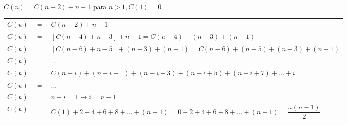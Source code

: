 \documentclass[12pt,a4paper]{article}
\begin{document}
\begin{enumerate}
	$C(n)= C(n-2)+n-1$ para $n>1, C(1)=0$
	
	\begin{table}[H]
		\centering
		\begin{tabular}{ccl}
			$C(n)$ & $=$ & $C(n-2)+n-1$\\
			$C(n)$ & $=$ & $[C(n-4)+n-3]+n-1=C(n-4)+(n-3)+(n-1)$\\
			$C(n)$ & $=$ & $[C(n-6)+n-5]+(n-3)+(n-1)=C(n-6)+(n-5)+(n-3)+(n-1)$\\
			$C(n)$ & $=$ & ...\\
			$C(n)$ & $=$ & $C(n-i)+(n-i+1)+(n-i+3)+(n-i+5)+(n-i+7)+...+i$\\
			$C(n)$ & $=$ & ...\\
			$C(n)$ & $=$ & $n-i=1 \rightarrow i=n-1$\\
			$C(n)$ & $=$ & $C(1)+2+4+6+8+...+(n-1) = 0+2+4+6+8+...+(n-1)=\dfrac{n(n-1)}{2}$\\
		\end{tabular}
	\end{table}	
		
\end{enumerate}



\end{document}
